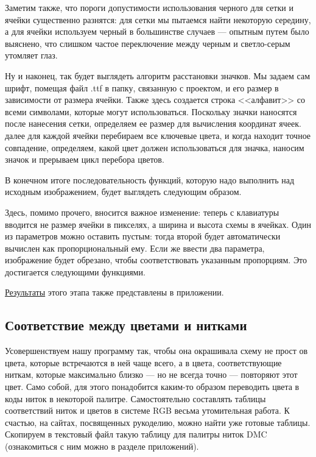 \documentclass[12pt]{article}
\begin{document}
{	Заметим также, что пороги допустимости использования черного для сетки и ячейки существенно разнятся: для сетки мы пытаемся найти некоторую середину, а для ячейки используем черный в большинстве случаев --- опытным путем было выяснено, что слишком частое переключение между черным и светло-серым утомляет глаз.
	
		
	
	Ну и наконец, так будет выглядеть алгоритм расстановки значков. Мы задаем сам шрифт, помещая файл .ttf в папку, связанную с проектом, и его размер в зависимости от размера ячейки. Также здесь создается строка <<алфавит>> со всеми символами, которые могут использоваться. Поскольку значки наносятся после нанесения сетки, определяем ее размер для вычисления координат ячеек. далее для каждой ячейки перебираем все ключевые цвета, и когда находит точное совпадение, определяем, какой цвет должен использоваться для значка, наносим значок и прерываем цикл перебора цветов.
	
	
	
	В конечном итоге последовательность функций, которую надо выполнить над исходным изображением, будет выглядеть следующим образом.
	
	
	
	Здесь, помимо прочего, вносится важное изменение: теперь с клавиатуры вводится не размер ячейки в пикселях, а  ширина и высота схемы в ячейках. Один из параметров можно оставить пустым: тогда второй будет автоматически вычислен как пропорциональный ему. Если же ввести два параметра, изображение будет обрезано, чтобы соответствовать указанным пропорциям. Это достигается следующими функциями.
	
	
	
	\hyperref[with_picto_cats]{Результаты} этого этапа также представлены в приложении. 
	
	\subsection{Соответствие между цветами и нитками}
	
	Усовершенствуем нашу программу так, чтобы она окрашивала схему не прост ов цвета, которые встречаются в ней чаще всего, а в цвета, соответствующие ниткам, которые максимально близко --- но не всегда точно --- повторяют этот цвет. Само собой, для этого понадобится каким-то образом переводить цвета в коды ниток в некоторой палитре. Самостоятельно составлять таблицы соответствий ниток и цветов в системе RGB весьма утомительная работа. К счастью, на сайтах, посвященных рукоделию, можно найти уже готовые таблицы. Скопируем в текстовый файл такую таблицу для палитры ниток DMC (ознакомиться с ним можно в разделе приложений).
	
}
\end{document}
